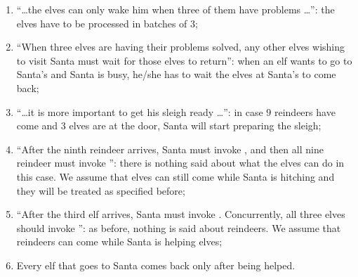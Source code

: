 \begin{enumerate}
\item ``\ldots the elves can only wake him when three of them have problems
\ldots'': the elves have to be processed in batches of $3$;

\item ``When three elves are having their problems solved, any other elves
wishing to visit Santa must wait for those elves to return'': when an elf wants
to go to Santa's and Santa is busy, he/she has to wait the elves at Santa's to come
back;

\item ``\ldots it is more important to get his sleigh ready \ldots'': in case $9$
reindeers have come and $3$ elves are at the door, Santa will start preparing
the sleigh;

\item ``After the ninth reindeer arrives, Santa must invoke , and
then all nine reindeer must invoke '': there is nothing said
about what the elves can do in this case. We assume that elves can still come
while Santa is hitching and they will be treated as specified before;

\item ``After the third elf arrives, Santa must invoke .
Concurrently, all three elves should invoke '': as before,
nothing is said about reindeers. We assume that reindeers can come while Santa
is helping elves;

\item Every elf that goes to Santa comes back only after being helped.
\end{enumerate}
